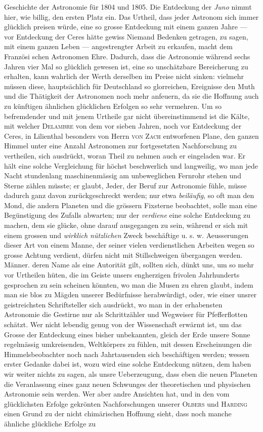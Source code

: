 Geschichte der Astronomie für 1804 und 1805. Die Entdeckung der \emph{Juno} nimmt hier, wie billig, den ersten Platz ein. Das Urtheil, dass jeder Astronom sich immer glücklich preisen würde, eine so grosse Entdeckung mit einem ganzen Jahre --- vor Entdeckung der Ceres hätte gewiss Niemand Bedenken getragen, zu sagen, mit einem ganzen Leben --- angestrengter Arbeit zu erkaufen, macht dem Französi%
%
schen Astronomen Ehre. Dadurch, dass die Astronomie während sechs Jahren vier Mal so glücklich gewesen ist, eine so unschätzbare Bereicherung zu erhalten, kann wahrlich der Werth derselben im Preise nicht sinken: vielmehr müssen diese, hauptsächlich für Deutschland so glorreichen, Ereignisse den Muth und die Thätigkeit der Astronomen noch mehr anfeuern, da sie die Hoffnung auch zu künftigen ähnlichen glücklichen Erfolgen so sehr vermehren. Um so befremdender und mit jenem Urtheile gar nicht übereinstimmend ist die Kälte, mit welcher \textsc{Delambre} von dem vor sieben Jahren, noch vor Entdeckung der Ceres, in Lilienthal besonders von Herrn \textsc{von Zach} entworfenen Plane, den ganzen Himmel unter eine Anzahl Astronomen zur fortgesetzten Nachforschung zu vertheilen, sich ausdrückt, woran Theil zu nehmen auch er eingeladen war. Er hält eine solche Vergleichung für höchst beschwerlich und langweilig, wo man jede Nacht stundenlang maschinenmässig am unbeweglichen Fernrohr stehen und Sterne zählen müsste; er glaubt, Jeder, der Beruf zur Astronomie fühle, müsse dadurch ganz davon zurückgeschreckt werden; nur etwa \emph{beiläufig}, so oft man den Mond, die andern Planeten und die grössern Fixsterne beobachtet, solle man eine Begünstigung des Zufalls abwarten; nur der \emph{verdiene} eine solche Entdeckung zu machen, dem sie glücke, ohne darauf ausgegangen zu sein, während er sich mit einem grossen und \emph{wirklich nützlichen} Zweck beschäftige u. s. w. Aeusserungen dieser Art von einem Manne, der seiner vielen verdienstlichen Arbeiten wegen so grosse Achtung verdient, dürfen nicht mit Stillschweigen übergangen werden. Männer. deren Name als eine Autorität gilt, sollten sich, dünkt uns, um so mehr vor Urtheilen hüten, die im Geiste unsers engherzigen frivolen Jahrhunderts gesprochen zu sein scheinen könnten, wo man die Musen zu ehren glaubt, indem man sie blos zu Mägden unserer Bedürfnisse herabwürdigt, oder, wie einer unsrer geistreichsten Schriftsteller sich ausdrückt, wo man in der erhabensten Astronomie die Gestirne nur als Schrittzähler und Wegweiser für Pfefferflotten schätzt. Wer nicht lebendig genug von der Wissenschaft erwärmt ist, um das Grosse der Entdeckung eines bisher unbekannten, gleich der Erde unsere Sonne regelmässig umkreisenden, Weltkörpers zu fühlen, mit dessen Erscheinungen die Himmelsbeobachter noch nach Jahrtausenden sich beschäftigen werden; wessen erster Gedanke dabei ist, wozu wird eine solche Entdeckung nützen, dem haben wir weiter nichts zu sagen, als unsre Ueberzeugung, dass eben die neuen Planeten die Veranlassung eines ganz neuen Schwunges der theoretischen und physischen Astronomie sein werden. Wer aber andre Ansichten hat, und in den vom glücklichsten Erfolge gekrönten Nachforschungen unserer \textsc{Olbers} und \textsc{Harding} einen Grund zu der nicht chimärischen Hoffnung sieht, dass noch manche ähnliche glückliche Erfolge zu 